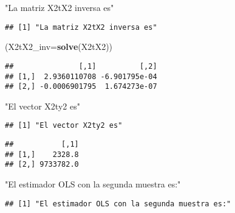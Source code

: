 \documentclass[
]{article}
\newenvironment{Shaded}{\begin{snugshade}}{\end{snugshade}}
\newcommand{\DataTypeTok}[1]{\textcolor[rgb]{0.13,0.29,0.53}{#1}}
\newcommand{\KeywordTok}[1]{\textcolor[rgb]{0.13,0.29,0.53}{\textbf{#1}}}
\newcommand{\NormalTok}[1]{#1}
\newcommand{\OperatorTok}[1]{\textcolor[rgb]{0.81,0.36,0.00}{\textbf{#1}}}
\newcommand{\StringTok}[1]{\textcolor[rgb]{0.31,0.60,0.02}{#1}}
\begin{document}
\begin{Shaded}
\begin{Highlighting}[]
\StringTok{"La matriz X2tX2 inversa es"}
\end{Highlighting}
\end{Shaded}

\begin{verbatim}
## [1] "La matriz X2tX2 inversa es"
\end{verbatim}

\begin{Shaded}
\begin{Highlighting}[]
\NormalTok{(}\DataTypeTok{X2tX2_inv=}\KeywordTok{solve}\NormalTok{(X2tX2))}
\end{Highlighting}
\end{Shaded}

\begin{verbatim}
##               [,1]          [,2]
## [1,]  2.9360110708 -6.901795e-04
## [2,] -0.0006901795  1.674273e-07
\end{verbatim}

\begin{Shaded}
\begin{Highlighting}[]
\StringTok{"El vector X2ty2 es"}
\end{Highlighting}
\end{Shaded}

\begin{verbatim}
## [1] "El vector X2ty2 es"
\end{verbatim}

\begin{Shaded}
\end{Shaded}

\begin{verbatim}
##           [,1]
## [1,]    2328.8
## [2,] 9733782.0
\end{verbatim}

\begin{Shaded}
\begin{Highlighting}[]
\StringTok{"El estimador OLS con la segunda muestra es:"}
\end{Highlighting}
\end{Shaded}

\begin{verbatim}
## [1] "El estimador OLS con la segunda muestra es:"
\end{verbatim}
\end{document}
